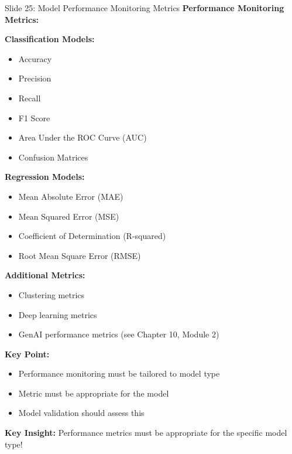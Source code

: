 \documentclass[8pt]{beamer}
\begin{document}
	\begin{frame}{Slide 25: Model Performance Monitoring Metrics}
		\fontsize{6.5}{7.5}\selectfont
		\textbf{Performance Monitoring Metrics:}
		
		\vspace{0.1cm}
		\textbf{Classification Models:}
		\begin{itemize}
			\item Accuracy
			\item Precision
			\item Recall
			\item F1 Score
			\item Area Under the ROC Curve (AUC)
			\item Confusion Matrices
		\end{itemize}
		
		\vspace{0.1cm}
		\textbf{Regression Models:}
		\begin{itemize}
			\item Mean Absolute Error (MAE)
			\item Mean Squared Error (MSE)
			\item Coefficient of Determination (R-squared)
			\item Root Mean Square Error (RMSE)
		\end{itemize}
		
		\vspace{0.1cm}
		\textbf{Additional Metrics:}
		\begin{itemize}
			\item Clustering metrics
			\item Deep learning metrics
			\item GenAI performance metrics (see Chapter 10, Module 2)
		\end{itemize}
		
		\vspace{0.1cm}
		\textbf{Key Point:}
		\begin{itemize}
			\item Performance monitoring must be tailored to model type
			\item Metric must be appropriate for the model
			\item Model validation should assess this
		\end{itemize}
		
		\textcolor{myblue}{\textbf{Key Insight:}} Performance metrics must be \textcolor{myblue}{appropriate for the specific model type}!
	\end{frame}
	
\end{document}
